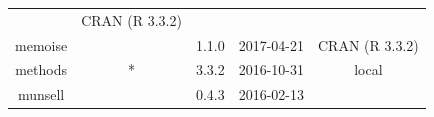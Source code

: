 \documentclass[]{article}
\begin{document}
\begin{itemize}
\begin{longtable}[]{@{}ccccc@{}}
\begin{minipage}[t]{0.13\columnwidth}
  \end{minipage} & \begin{minipage}[t]{0.29\columnwidth}\centering\strut
  CRAN (R 3.3.2)\strut
  \end{minipage}\tabularnewline
  \begin{minipage}[t]{0.13\columnwidth}\centering\strut
  memoise\strut
  \end{minipage} & \begin{minipage}[t]{0.05\columnwidth}\centering\strut
  \strut
  \end{minipage} & \begin{minipage}[t]{0.13\columnwidth}\centering\strut
  1.1.0\strut
  \end{minipage} & \begin{minipage}[t]{0.13\columnwidth}\centering\strut
  2017-04-21\strut
  \end{minipage} & \begin{minipage}[t]{0.29\columnwidth}\centering\strut
  CRAN (R 3.3.2)\strut
  \end{minipage}\tabularnewline
  \begin{minipage}[t]{0.13\columnwidth}\centering\strut
  methods\strut
  \end{minipage} & \begin{minipage}[t]{0.05\columnwidth}\centering\strut
  *\strut
  \end{minipage} & \begin{minipage}[t]{0.13\columnwidth}\centering\strut
  3.3.2\strut
  \end{minipage} & \begin{minipage}[t]{0.13\columnwidth}\centering\strut
  2016-10-31\strut
  \end{minipage} & \begin{minipage}[t]{0.29\columnwidth}\centering\strut
  local\strut
  \end{minipage}\tabularnewline
  \begin{minipage}[t]{0.13\columnwidth}\centering\strut
  munsell\strut
  \end{minipage} & \begin{minipage}[t]{0.05\columnwidth}\centering\strut
  \strut
  \end{minipage} & \begin{minipage}[t]{0.13\columnwidth}\centering\strut
  0.4.3\strut
  \end{minipage} & \begin{minipage}[t]{0.13\columnwidth}\centering\strut
  2016-02-13\strut
  \end{minipage} & \begin{minipage}[t]{0.29\columnwidth}\centering\strut

\end{minipage}
\end{longtable}
\end{itemize}
\end{document}
